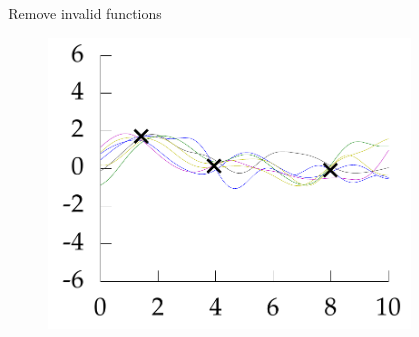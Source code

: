 \documentclass[10pt]{beamer}
\begin{document}
\begin{frame}
\begin{columns}
\begin{column}{0.33\textwidth}
\begin{figure}
        \end{figure}
      \end{column}
      \pause
      \begin{column}{0.33\textwidth}
        Remove invalid functions
        \begin{figure}
          \centering
          \includegraphics[width=\textwidth]{func3.png}
        \end{figure}
      \end{column}
    \end{columns}
  \end{frame}
\end{document}

